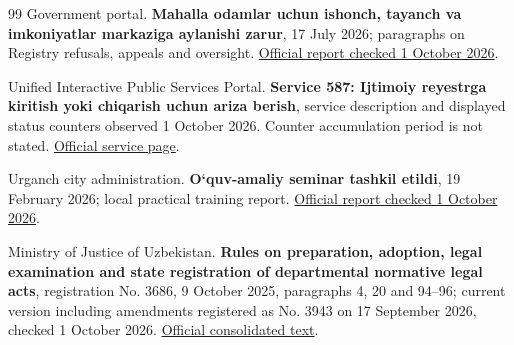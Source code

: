 \begin{thebibliography}{99}
 Government portal. \textbf{Mahalla odamlar uchun ishonch, tayanch va imkoniyatlar markaziga aylanishi zarur}, 17 July 2026; paragraphs on Registry refusals, appeals and oversight. \href{https://gov.uz/oz/news/view/194551}{Official report checked 1 October 2026}.

 Unified Interactive Public Services Portal. \textbf{Service 587: Ijtimoiy reyestrga kiritish yoki chiqarish uchun ariza berish}, service description and displayed status counters observed 1 October 2026. Counter accumulation period is not stated. \href{https://oldmy.gov.uz/oz/service/587}{Official service page}.

 Urganch city administration. \textbf{O‘quv-amaliy seminar tashkil etildi}, 19 February 2026; local practical training report. \href{https://gov.uz/oz/urganchshahar/news/view/134892}{Official report checked 1 October 2026}.

 Ministry of Justice of Uzbekistan. \textbf{Rules on preparation, adoption, legal examination and state registration of departmental normative legal acts}, registration No. 3686, 9 October 2025, paragraphs 4, 20 and 94–96; current version including amendments registered as No. 3943 on 17 September 2026, checked 1 October 2026. \href{https://lex.uz/docs/-7766987}{Official consolidated text}.

\end{thebibliography}
